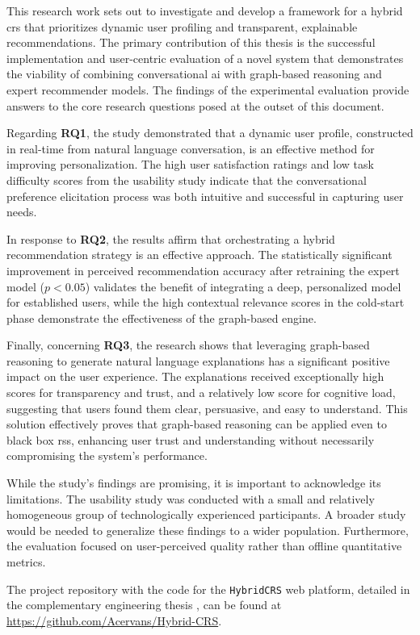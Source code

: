 This research work sets out to investigate and develop a framework for a hybrid \ac{crs} that prioritizes dynamic user profiling and transparent, explainable recommendations. The primary contribution of this thesis is the successful implementation and user-centric evaluation of a novel system that demonstrates the viability of combining conversational \ac{ai} with graph-based reasoning and expert recommender models. The findings of the experimental evaluation provide answers to the core research questions posed at the outset of this document.

Regarding \textbf{RQ1}, the study demonstrated that a dynamic user profile, constructed in real-time from natural language conversation, is an effective method for improving personalization. The high user satisfaction ratings and low task difficulty scores from the usability study indicate that the conversational preference elicitation process was both intuitive and successful in capturing user needs.

In response to \textbf{RQ2}, the results affirm that orchestrating a hybrid recommendation strategy is an effective approach. The statistically significant improvement in perceived recommendation accuracy after retraining the expert model ($p < 0.05$) validates the benefit of integrating a deep, personalized model for established users, while the high contextual relevance scores in the cold-start phase demonstrate the effectiveness of the graph-based engine.

Finally, concerning \textbf{RQ3}, the research shows that leveraging graph-based reasoning to generate natural language explanations has a significant positive impact on the user experience. The explanations received exceptionally high scores for transparency and trust, and a relatively low score for cognitive load, suggesting that users found them clear, persuasive, and easy to understand. This solution effectively proves that graph-based reasoning can be applied even to black box \aclp{rs}, enhancing user trust and understanding without necessarily compromising the system's performance.

While the study's findings are promising, it is important to acknowledge its limitations. The usability study was conducted with a small and relatively homogeneous group of technologically experienced participants. A broader study would be needed to generalize these findings to a wider population. Furthermore, the evaluation focused on user-perceived quality rather than offline quantitative metrics.

The project repository with the code for the \texttt{HybridCRS} web platform, detailed in the complementary engineering thesis \cite{MUII-THESIS}, can be found at \url{https://github.com/Acervans/Hybrid-CRS}.
